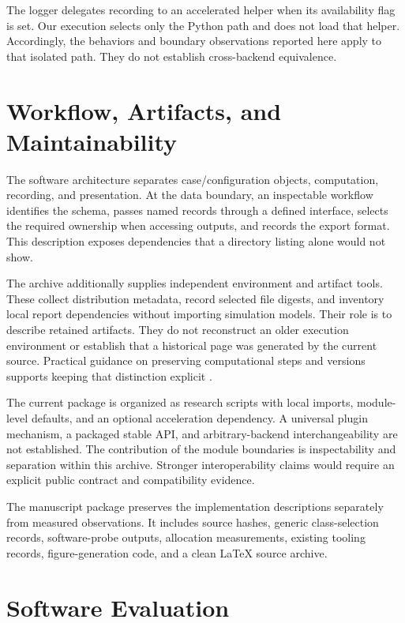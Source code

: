 \documentclass[11pt,a4paper]{article}
\begin{document}
The logger delegates recording to an accelerated helper when its availability flag is set. Our execution selects only the Python path and does not load that helper. Accordingly, the behaviors and boundary observations reported here apply to that isolated path. They do not establish cross-backend equivalence.

\section{Workflow, Artifacts, and Maintainability}
\label{sec:workflow}
The software architecture separates case/configuration objects, computation, recording, and presentation. At the data boundary, an inspectable workflow identifies the schema, passes named records through a defined interface, selects the required ownership when accessing outputs, and records the export format. This description exposes dependencies that a directory listing alone would not show.

The archive additionally supplies independent environment and artifact tools. These collect distribution metadata, record selected file digests, and inventory local report dependencies without importing simulation models. Their role is to describe retained artifacts. They do not reconstruct an older execution environment or establish that a historical page was generated by the current source. Practical guidance on preserving computational steps and versions supports keeping that distinction explicit \citep{sandve2013,barba2021}.

The current package is organized as research scripts with local imports, module-level defaults, and an optional acceleration dependency. A universal plugin mechanism, a packaged stable API, and arbitrary-backend interchangeability are not established. The contribution of the module boundaries is inspectability and separation within this archive. Stronger interoperability claims would require an explicit public contract and compatibility evidence.

The manuscript package preserves the implementation descriptions separately from measured observations. It includes source hashes, generic class-selection records, software-probe outputs, allocation measurements, existing tooling records, figure-generation code, and a clean LaTeX source archive.

\section{Software Evaluation}
\label{sec:evaluation}
\end{document}
